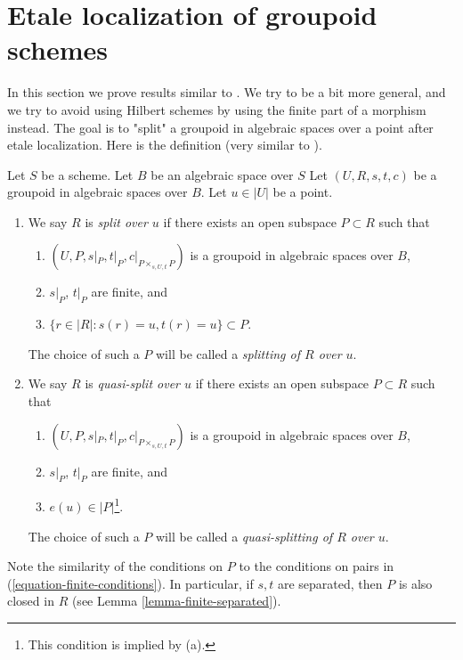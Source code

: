\section{Etale localization of groupoid schemes}
\label{section-etale-localize}

\noindent
In this section we prove results similar to \cite[Proposition 4.2]{K-M}.
We try to be a bit more general, and we try to avoid using Hilbert schemes
by using the finite part of a morphism instead. 
The goal is to "split" a groupoid in algebraic spaces over a point
after etale localization. Here is the definition (very similar to
\cite[Definition 4.1]{K-M}).

\begin{definition}
\label{definition-split-at-point}
Let $S$ be a scheme. Let $B$ be an algebraic space over $S$
Let $(U, R, s, t, c)$ be a groupoid in algebraic spaces over $B$.
Let $u \in |U|$ be a point.
\begin{enumerate}
\item We say $R$ is {\it split over $u$} if there exists an open
subspace $P \subset R$ such that
\begin{enumerate}
\item $(U, P, s|_P, t|_P, c|_{P \times_{s, U, t} P})$ is a
groupoid in algebraic spaces over $B$,
\item $s|_P$, $t|_P$ are finite, and
\item $\{r \in |R| : s(r) = u, t(r) = u\} \subset P$.
\end{enumerate}
The choice of such a $P$ will be called a {\it splitting of $R$ over $u$}.
\item We say $R$ is {\it quasi-split over $u$} if there exists an open
subspace $P \subset R$ such that
\begin{enumerate}
\item $(U, P, s|_P, t|_P, c|_{P \times_{s, U, t} P})$ is a
groupoid in algebraic spaces over $B$,
\item $s|_P$, $t|_P$ are finite, and
\item $e(u) \in |P|$\footnote{This condition is implied by (a).}.
\end{enumerate}
The choice of such a $P$ will be called a {\it quasi-splitting of $R$ over $u$}.
\end{enumerate}
\end{definition}

\noindent
Note the similarity of the conditions on $P$ to the conditions on
pairs in (\ref{equation-finite-conditions}). In particular, if
$s, t$ are separated, then $P$ is also closed in $R$ (see
Lemma \ref{lemma-finite-separated}).

